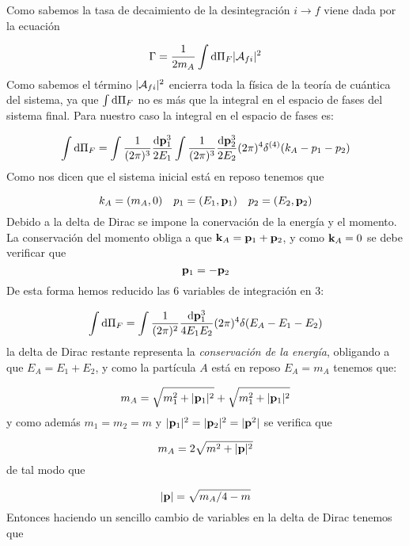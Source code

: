 \begin{solucion} 
	Como sabemos la tasa de decaimiento de la desintegración $i\rightarrow f$ viene dada por la ecuación
	
	\begin{equation*}
		\Gamma = \frac{1}{2m_A} \int \mathrm{d} \Pi_F |\mathcal{A}_{fi}|^2
	\end{equation*}
	Como sabemos el término $|\mathcal{A}_{fi}|^2$ encierra toda la física de la teoría de cuántica del sistema, ya que $\int \mathrm{d} \Pi_F$ no es más que la integral en el espacio de fases del sistema final. Para nuestro caso la integral en el espacio de fases es:
	
	\begin{equation*}
		\int \mathrm{d} \Pi_F = \int \frac{1}{(2\pi)^3} \frac{\mathrm{d} \mathbf{p}_1^3}{2E_1} \int \frac{1}{(2\pi)^3} \frac{\mathrm{d} \mathbf{p}_2^3}{2E_2} (2\pi)^4 \delta^{(4)} (k_A - p_1 - p_2)
	\end{equation*}
	Como nos dicen que el sistema inicial está en reposo tenemos que
	
	\begin{equation*}
		k_A=(m_A,0) \quad p_1 = (E_1,\mathbf{p}_1) \quad p_2 = (E_2,\mathbf{p}_2)
	\end{equation*}
	Debido a la delta de Dirac se impone la conervación de la energía y el momento. La conservación del momento obliga a que $\mathbf{k}_A=\mathbf{p}_1+\mathbf{p}_2$, y como $\mathbf{k}_A=0$ se debe verificar que	
	\begin{equation*}
		\mathbf{p}_1 = - \mathbf{p}_2 
	\end{equation*}
	De esta forma hemos reducido las 6 variables de integración en 3:
	
	\begin{equation*}
		\int \mathrm{d} \Pi_F = \int \frac{1}{(2\pi)^2} \frac{\mathrm{d} \mathbf{p}_1^3}{4E_1E_2} (2\pi)^4 \delta (E_A-E_1-E_2)
	\end{equation*}
	la delta de Dirac restante representa la \textit{conservación de la energía}, obligando a que $E_A=E_1 + E_2$, y como la partícula $A$ está en reposo $E_A=m_A$ tenemos que:
	
	\begin{equation*}
		m_A =\sqrt{m_1^2 + |\mathbf{p}_1|^2 }+\sqrt{m_1^2 + |\mathbf{p}_1|^2 }
	\end{equation*}
	y como además $m_1=m_2=m$ y $|\mathbf{p}_1|^2=|\mathbf{p}_2|^2=|\mathbf{p}^2|$ se verifica que
	
	\begin{equation*}
		m_A =2\sqrt{m^2 + |\mathbf{p}|^2 }
	\end{equation*}
	de tal modo que
	
	\begin{equation*}
		|\mathbf{p}| = \sqrt{m_A/4-m}
	\end{equation*}	
	Entonces haciendo un sencillo cambio de variables en la delta de Dirac tenemos que 
	

\end{solucion}
